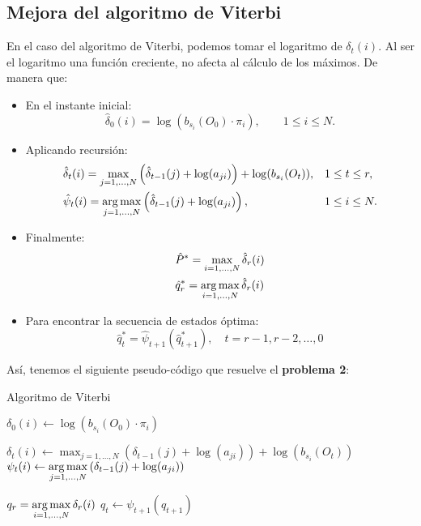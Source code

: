 \subsection{Mejora del algoritmo de Viterbi}
En el caso del algoritmo de Viterbi, podemos tomar el logaritmo de $\delta_t(i)$. Al ser el logaritmo una función creciente, no afecta al cálculo de los máximos. De manera que:
\begin{itemize}
    \item En el instante inicial:
    \begin{equation*}
        \hat{\delta}_0(i)=\log(b_{s_i}(O_0)\cdot\pi_i), \qquad 1\leq i\leq N.
    \end{equation*}
    \item Aplicando recursión:
    \begin{align*}
        &\hat{\delta}_t(i)=\max_{j=1,\dots,N}\left( \hat{\delta}_{t-1}(j)+\log(a_{ji}) \right)+\log(b_{s_i}(O_t)), && 1\leq t\leq r, \\
        &\hat{\psi}_t(i)=\operatorname*{\arg\max}_{j=1,\dots,N}\left(\hat{\delta}_{t-1}(j)+\log(a_{ji})\right),  &&  1\leq i\leq N.
    \end{align*}
    \item Finalmente:
    \begin{align*}
        & \hat{P}^*=\max_{i=1,\dots,N} \hat{\delta}_r(i)\\
        & \hat{q}_r^*=\operatorname*{\arg\max}_{i=1,\dots,N} \hat{\delta}_r(i)
    \end{align*} 
    \item Para encontrar la secuencia de estados óptima:
    \[\hat{q}_t^*=\hat{\psi}_{t+1}(\hat{q}_{t+1}^*), \quad t=r-1,r-2,\dots,0\]
\end{itemize}
Así, tenemos el siguiente pseudo-código que resuelve el \textbf{problema 2}: \medskip
\begin{breakablealgorithm}
\caption{Algoritmo de Viterbi} \label{PseudocódigoViterbi}
\begin{algorithmic}[1]


        \State $\delta_0(i)\gets \log(b_{s_i}(O_0)\cdot\pi_i)$
    \EndFor \State
    
            \State $\delta_t(i)\gets \displaystyle\max_{j=1,\dots,N}\left( \delta_{t-1}(j)+\log(a_{ji}) \right)+\log(b_{s_i}(O_t))$
            \State $\psi_t(i) \gets \displaystyle\operatorname*{\arg\max}_{j=1,\dots,N}\left(\delta_{t-1}(j)+\log(a_{ji})\right)$
         \EndFor
    \EndFor
    
    \State $q_r=\displaystyle\operatorname*{\arg\max}_{i=1,\dots,N} \delta_r(i)$
        \State $q_t\gets\psi_{t+1}(q_{t+1})$
    \EndFor
    
\end{algorithmic}
\end{breakablealgorithm}
